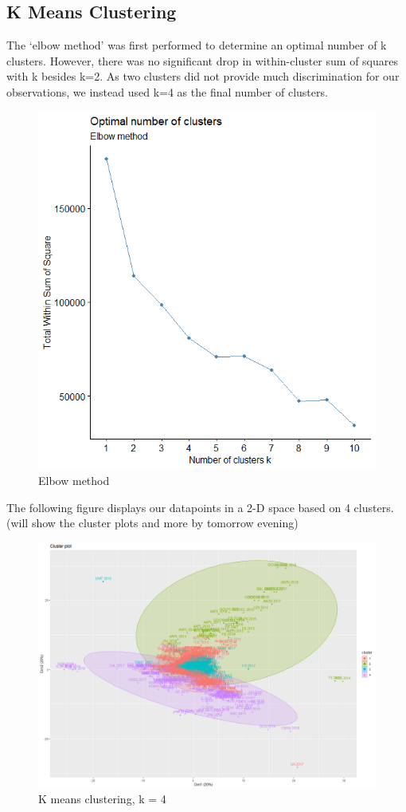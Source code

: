 \documentclass[11pt,]{article}
\begin{document}
\hypertarget{k-means-clustering}{%
\subsection{K Means Clustering}\label{k-means-clustering}}

The `elbow method' was first performed to determine an optimal number of
k clusters. However, there was no significant drop in within-cluster sum
of squares with k besides k=2. As two clusters did not provide much
discrimination for our observations, we instead used k=4 as the final
number of clusters.

\begin{figure}
\includegraphics[width=0.7\linewidth,height=0.5\textheight]{unsupervised_elbow} \caption{Elbow method}\label{fig:elbow}
\end{figure}

The following figure displays our datapoints in a 2-D space based on 4
clusters. (will show the cluster plots and more by tomorrow evening)

\begin{figure}
\includegraphics[width=1\linewidth,height=0.7\textheight]{cluster_image} \caption{K means clustering, k = 4}\label{fig:cluster}
\end{figure}
\end{document}
